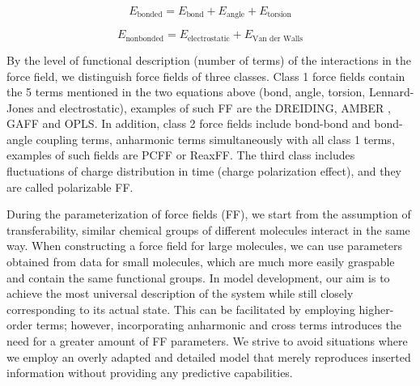 \begin{equation}\label{eq:ff2}
	E_{\text{bonded}} = E_{\text{bond}} + E_{\text{angle}} + E_{\text{torsion}}
\end{equation}

\begin{equation}\label{eq:ff3}
	E_{\text{nonbonded}} = E_{\text{electrostatic}} + E_{\text{Van der Walls}}
\end{equation}

%

By the level of functional description (number of terms) of the interactions in the force field, we distinguish force fields of three classes. Class 1 force fields contain the 5 terms mentioned in the two equations above (bond, angle, torsion, Lennard-Jones and electrostatic), examples of such FF are the DREIDING, AMBER \cite{brooks_charmm_2009}, GAFF and OPLS. In addition, class 2 force fields include bond-bond and bond-angle coupling terms, anharmonic terms simultaneously with all class 1 terms, examples of such fields are PCFF or ReaxFF.  The third class includes fluctuations of charge distribution in time (charge polarization effect), and they are called polarizable FF. \cite{vanommeslaeghe_molecular_2014}

During the parameterization of force fields (FF), we start from the assumption of transferability,  similar chemical groups of different molecules interact in the same way. When constructing a force field for large molecules, we can use parameters obtained from data for small molecules, which are much more easily graspable and contain the same functional groups. \cite{monticelli_force_2013} In model development, our aim is to achieve the most universal description of the system while still closely corresponding to its actual state. This can be facilitated by employing higher-order terms; however, incorporating anharmonic and cross terms introduces the need for a greater amount of FF parameters. We strive to avoid situations where we employ an overly adapted and detailed model that merely reproduces inserted information without providing any predictive capabilities. \cite{vanommeslaeghe_molecular_2014}

